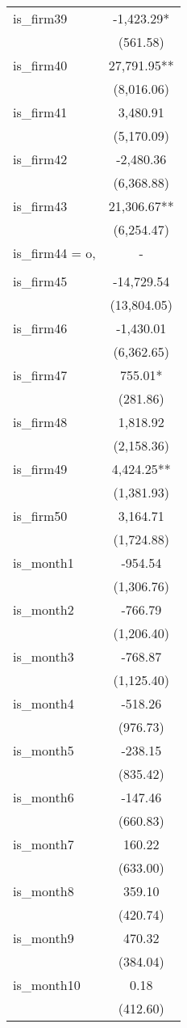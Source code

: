 \begin{tabular}{lc}
is\_firm39 & -1,423.29* \\
 & (561.58) \\
is\_firm40 & 27,791.95** \\
 & (8,016.06) \\
is\_firm41 & 3,480.91 \\
 & (5,170.09) \\
is\_firm42 & -2,480.36 \\
 & (6,368.88) \\
is\_firm43 & 21,306.67** \\
 & (6,254.47) \\
is\_firm44 = o, & - \\
 &  \\
is\_firm45 & -14,729.54 \\
 & (13,804.05) \\
is\_firm46 & -1,430.01 \\
 & (6,362.65) \\
is\_firm47 & 755.01* \\
 & (281.86) \\
is\_firm48 & 1,818.92 \\
 & (2,158.36) \\
is\_firm49 & 4,424.25** \\
 & (1,381.93) \\
is\_firm50 & 3,164.71 \\
 & (1,724.88) \\
is\_month1 & -954.54 \\
 & (1,306.76) \\
is\_month2 & -766.79 \\
 & (1,206.40) \\
is\_month3 & -768.87 \\
 & (1,125.40) \\
is\_month4 & -518.26 \\
 & (976.73) \\
is\_month5 & -238.15 \\
 & (835.42) \\
is\_month6 & -147.46 \\
 & (660.83) \\
is\_month7 & 160.22 \\
 & (633.00) \\
is\_month8 & 359.10 \\
 & (420.74) \\
is\_month9 & 470.32 \\
 & (384.04) \\
is\_month10 & 0.18 \\
 & (412.60) \\

\end{tabular}

